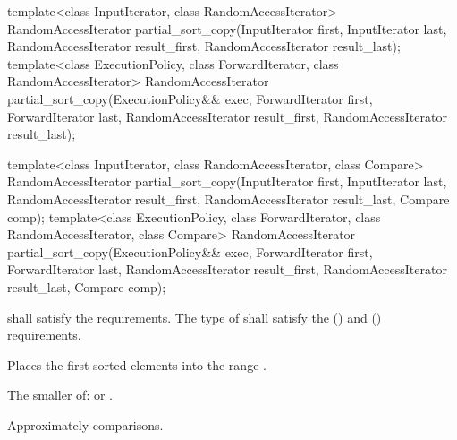 %
\begin{itemdecl}
template<class InputIterator, class RandomAccessIterator>
  RandomAccessIterator
    partial_sort_copy(InputIterator first, InputIterator last,
                      RandomAccessIterator result_first,
                      RandomAccessIterator result_last);
template<class ExecutionPolicy, class ForwardIterator, class RandomAccessIterator>
  RandomAccessIterator
    partial_sort_copy(ExecutionPolicy&& exec,
                      ForwardIterator first, ForwardIterator last,
                      RandomAccessIterator result_first,
                      RandomAccessIterator result_last);

template<class InputIterator, class RandomAccessIterator,
         class Compare>
  RandomAccessIterator
    partial_sort_copy(InputIterator first, InputIterator last,
                      RandomAccessIterator result_first,
                      RandomAccessIterator result_last,
                      Compare comp);
template<class ExecutionPolicy, class ForwardIterator, class RandomAccessIterator,
         class Compare>
  RandomAccessIterator
    partial_sort_copy(ExecutionPolicy&& exec,
                      ForwardIterator first, ForwardIterator last,
                      RandomAccessIterator result_first,
                      RandomAccessIterator result_last,
                      Compare comp);
\end{itemdecl}

\begin{itemdescr}
\pnum
\requires
{} shall satisfy the
 requirements. The type
of  shall satisfy the
 () and
 () requirements.

\pnum
\effects
Places the first
sorted elements into the range
.

\pnum
\returns
The smaller of:
 or
.

\pnum
\complexity
Approximately
comparisons.
\end{itemdescr}

